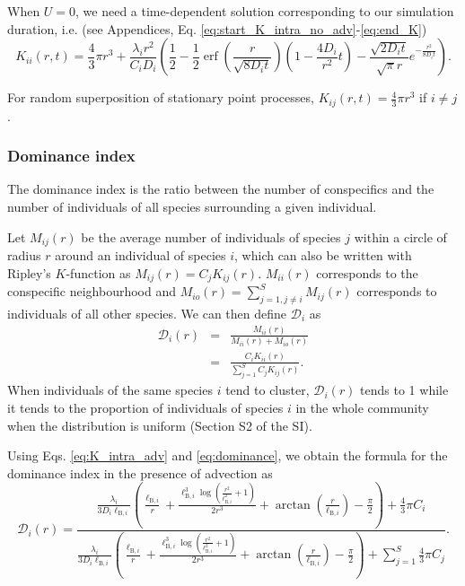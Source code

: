 \documentclass[12pt,english]{article}
\DeclareMathOperator\erf{erf}
\newcommand{\ellB}{\ell_{\mathrm{B},i}}
\begin{document}
When $U=0$, we need a time-dependent solution corresponding to our
simulation duration, i.e. (see Appendices, Eq. \ref{eq:start_K_intra_no_adv}-\ref{eq:end_K})
\begin{equation}
K_{ii}(r,t)=\frac{4}{3}\pi r^{3}+\frac{\lambda_{i}r^{2}}{C_{i}D_{i}}\left(\frac{1}{2}-\frac{1}{2}\erf\left(\frac{r}{\sqrt{8D_{i}t}}\right)\left(1-\frac{4D_{i}}{r^{2}}t\right)-\frac{\sqrt{2D_{i}t}}{\sqrt{\pi}r}e^{-\frac{r^{2}}{8D_{i}t}}\right).\label{eq:K_intra_no_adv}
\end{equation}

For random superposition of stationary point processes, $K_{ij}(r,t)=\frac{4}{3}\pi r^{3}$
if $i\neq j$ \citep[p. 324, eq. 5.3.5]{illian2008statistical}.

\subsubsection*{Dominance index}

The dominance index \citep[defined in Table S1 in the Supporting Information of][]{wiegand_how_2007}
is the ratio between the number of conspecifics and the number of
individuals of all species surrounding a given individual.

Let $M_{ij}(r)$ be the average number of individuals of species $j$
within a circle of radius $r$ around an individual of species $i$,
which can also be written with Ripley's $K$-function as $M_{ij}(r)=C_{j}K_{ij}(r)$.
$M_{ii}(r)$ corresponds to the conspecific neighbourhood and $M_{io}(r)=\sum_{j=1,j\neq i}^{S}M_{ij}(r)$
corresponds to individuals of all other species. We can then define
$\mathcal{D}_{i}$ as 
\begin{equation}
\begin{array}{ccc}
\mathcal{D}_{i}(r) & = & \frac{M_{ii}(r)}{M_{ii}(r)+M_{io}(r)}\\
 & = & \frac{C_{i}K_{ii}(r)}{\sum_{j=1}^{S}C_{j}K_{ij}(r)}.
\end{array}\label{eq:dominance}
\end{equation}
 When individuals of the same species $i$ tend to cluster, $\mathcal{D}_{i}(r)$
tends to 1 while it tends to the proportion of individuals of species
$i$ in the whole community when the distribution is uniform (Section
S2 of the SI).

Using Eqs. \ref{eq:K_intra_adv} and \ref{eq:dominance}, we obtain
the formula for the dominance index in the presence of advection as
\begin{equation}
\mathcal{D}_{i}(r)=\frac{\frac{\lambda_{i}}{3D_{i}\ellB}\left(\frac{\ellB}{r}+\frac{\ellB^{3}\log\left(\frac{r^{2}}{\ellB^{2}}+1\right)}{2r^{3}}+\arctan\left(\frac{r}{\ellB}\right)-\frac{\pi}{2}\right)+\frac{4}{3}\pi C_{i}}{\frac{\lambda_{i}}{3D_{i}\ellB}\left(\frac{\ellB}{r}+\frac{\ellB^{3}\log\left(\frac{r^{2}}{\ellB^{2}}+1\right)}{2r^{3}}+\arctan\left(\frac{r}{\ellB}\right)-\frac{\pi}{2}\right)+\sum_{j=1}^{S}\frac{4}{3}\pi C_{j}}.\label{eq:dom_adv}
\end{equation}
\end{document}
